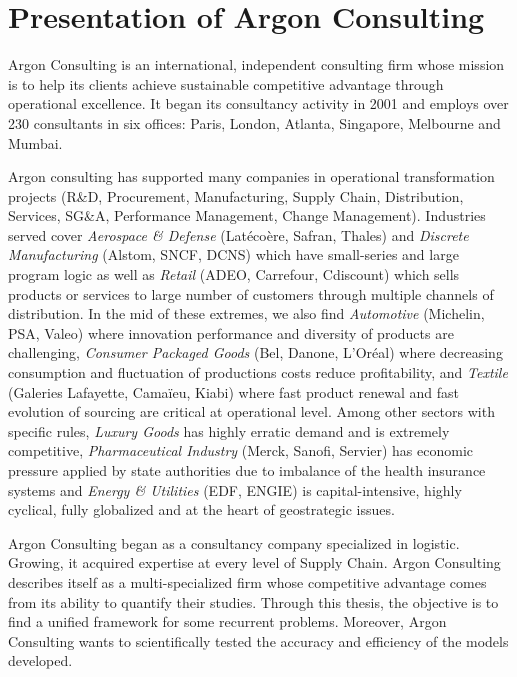 \section{Presentation of Argon Consulting}


Argon Consulting is an international, independent consulting firm whose mission is to help its clients achieve sustainable competitive advantage through operational excellence.
It began its consultancy activity in 2001 and employs over 230 consultants in six offices: Paris, London, Atlanta, Singapore, Melbourne and Mumbai.


Argon consulting has supported many companies in operational transformation projects (R\&D, Procurement, Manufacturing, Supply Chain, Distribution, Services, SG\&A, Performance Management, Change Management).
Industries served cover
\emph{Aerospace \& Defense} (Lat\'eco\`ere, Safran, Thales) and
\emph{Discrete Manufacturing} (Alstom, SNCF, DCNS) which have small-series and large program logic as well as
\emph{Retail} (ADEO, Carrefour, Cdiscount) which sells products or services to large number of customers through multiple channels of distribution.
In the mid of these extremes, we also find
\emph{Automotive} (Michelin, PSA, Valeo) where innovation performance and diversity of products are challenging,
\emph{Consumer Packaged Goods} (Bel, Danone, L'Oréal) where decreasing consumption and fluctuation of productions costs reduce profitability, and
\emph{Textile} (Galeries Lafayette, Cama\"ieu, Kiabi) where fast product renewal and fast evolution of sourcing are critical at operational level.
Among other sectors with specific rules,
\emph{Luxury Goods} has highly erratic demand and is extremely competitive,
\emph{Pharmaceutical Industry} (Merck, Sanofi, Servier) has economic pressure applied by state authorities due to imbalance of the health insurance systems and
\emph{Energy \& Utilities} (EDF, ENGIE) is capital-intensive, highly cyclical, fully globalized and at the heart of geostrategic issues.


Argon Consulting began as a consultancy company specialized in logistic.
Growing, it acquired expertise at every level of Supply Chain.
Argon Consulting describes itself as a multi-specialized firm whose competitive advantage comes from its ability to quantify their studies.
Through this thesis, the objective is to find a unified framework for some recurrent problems.
Moreover, Argon Consulting wants to scientifically tested the accuracy and efficiency of the models developed.






